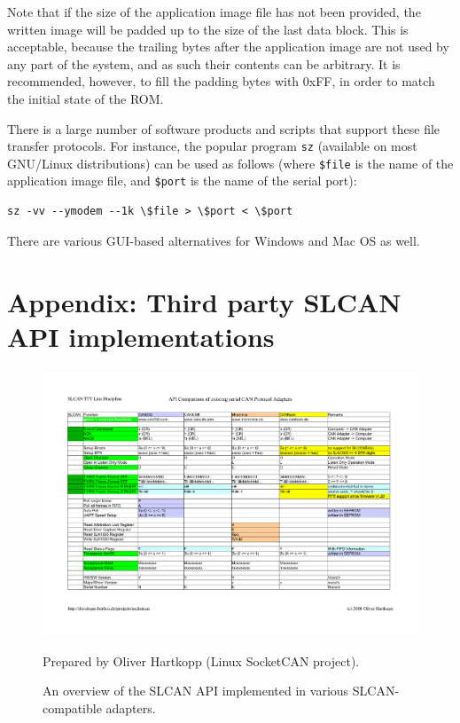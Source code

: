 \documentclass{zubaxdoc}
\begin{document}
Note that if the size of the application image file has not been provided,
the written image will be padded up to the size of the last data block.
This is acceptable, because the trailing bytes after the application image are
not used by any part of the system, and as such their contents can be arbitrary.
It is recommended, however, to fill the padding bytes with 0xFF,
in order to match the initial state of the ROM.

There is a large number of software products and scripts that support these file transfer protocols.
For instance, the popular program \verb|sz| (available on most GNU/Linux distributions) can be used as follows
(where \verb|$file| is the name of the application image file, and \verb|$port| is the name of the serial port):
\begin{verbatim}
sz -vv --ymodem --1k \$file > \$port < \$port
\end{verbatim}
There are various GUI-based alternatives for Windows and Mac OS as well.

%
%
\appendix
\chapter{Appendix: Third party SLCAN API implementations}\label{appendix:slcan_api_overview}

\begin{figure}[hbtp]
    \centering
	\centerline{\includegraphics[width=1.2\textwidth]{Generic_SLCAN_API}}
	\caption{An overview of the SLCAN API implemented in various SLCAN-compatible adapters.
	\label{fig:Generic_SLCAN_API}}
	Prepared by Oliver Hartkopp (Linux SocketCAN project).
\end{figure}
\end{document}
